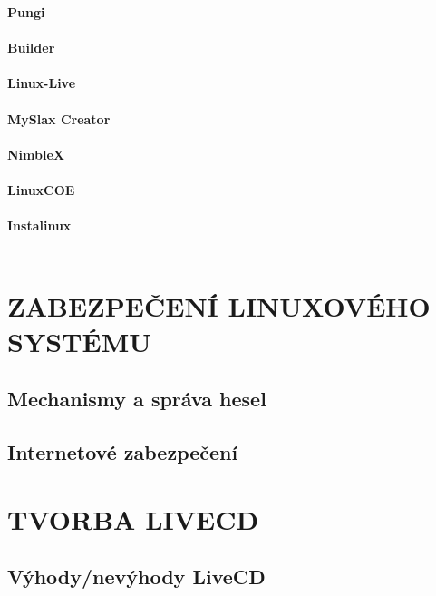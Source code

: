 \documentclass[a4paper,12pt]{article}
\newcommand{\sectionV}[1]{\section{\uppercase{#1}}}	%
\newcommand{\nadpis}[1]{%
	\vspace{4 mm}
	\textbf{#1}\\
	\vspace{4 mm}
	}
\begin{document}
\nadpis{Pungi}\\
\nadpis{Builder}\\
\nadpis{Linux-Live}\\
\nadpis{MySlax Creator}\\
\nadpis{NimbleX}\\
\nadpis{LinuxCOE}\\
\nadpis{Instalinux}\\

\sectionV{Zabezpečení Linuxového systému}
\subsection{Mechanismy a správa hesel}
\subsection{Internetové zabezpečení}

\sectionV{Tvorba LiveCD}
\subsection{Výhody/nevýhody LiveCD}
\end{document}
